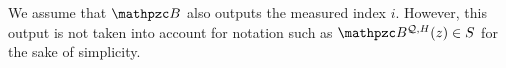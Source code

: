 %
%
%
%
%
%
%
%
%
%
%
%

\begin{remark}
We assume that $\qB$ also outputs the measured index $i$. However,
this output is not taken into account for notation such as $\qB^{\cQ,
H}(z) \in S$ for the sake of simplicity.
\end{remark}


